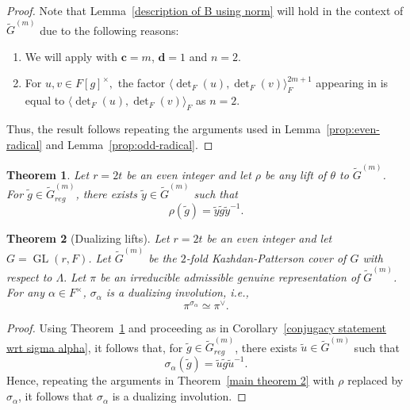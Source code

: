 \documentclass[11pt, a4paper, reqno]{amsart}
\newtheorem{theorem}{Theorem}[section]
\theoremstyle{definition}
\theoremstyle{remark}
\theoremstyle{example}
\theoremstyle{note}
\numberwithin{equation}{section}
\DeclareMathOperator{\GL}{GL}
\begin{document}
\begin{proof}
Note that Lemma~\ref{description of B using norm} will hold in the context of $\widetilde{G}^{(m)}$ due to the following reasons:
   \begin{enumerate}[label=\roman*), itemsep=0.2cm]
        \item We will apply \cite[Proposition~4.2(5a), formula~(4.10)]{Zou2025} with $\boldsymbol c=m$, $\boldsymbol d=1$ and $n=2$. 

        \item For $u, v \in F[g]^\times,$ the factor $\langle \det_F(u),\det_F(v) \rangle_F^{2m+1}$ appearing in \cite[Proposition~4.2(5a), formula~(4.10)]{Zou2025} is equal to $\langle \det_F(u),\det_F(v) \rangle_F$ as $n=2.$
  \end{enumerate}
Thus, the result follows repeating the arguments used in  Lemma~\ref{prop:even-radical} and  Lemma~\ref{prop:odd-radical}.
\end{proof}



\begin{theorem}\label{thm:even-conjugacy for twisted covers} Let $r =2t$ be an even integer and let $\rho$ be any lift of $\theta$ to  $\widetilde{G}^{(m)}$. For $\tilde{g}\in \widetilde{G}^{(m)}_{reg}$, there exists $\tilde{y}\in \widetilde{G}^{(m)}$ such that 
\[\rho(\tilde{g})=\tilde{y}\tilde{g}\tilde{y}^{-1}.
\]
\end{theorem}

\begin{theorem}[Dualizing lifts] 
Let $r =2t$ be an even integer and let $G=\GL(r,F)$. Let $\widetilde{G}^{(m)}$ be the $2$-fold Kazhdan-Patterson cover of $G$ with respect to $\Lambda.$
Let $\pi$ be an irreducible admissible genuine representation of $\widetilde{G}^{(m)}$. For any $\alpha \in F^{\times}$, $\sigma_\alpha$ is a dualizing involution, i.e.,
\[\pi^{\sigma_{\alpha}}\simeq \pi^{\vee}. \] 
\end{theorem}

\begin{proof}
 Using Theorem~\ref{thm:even-conjugacy for twisted covers} and proceeding as in Corollary~\ref{conjugacy statement wrt sigma alpha}, it follows that, for
 $\tilde{g} \in \widetilde{G}^{(m)}_{reg}$, there exists $\tilde{u}\in \widetilde{G}^{(m)}$ such that 
\[\sigma_\alpha(\tilde{g})=\tilde{u}\tilde{g}\tilde{u}^{-1}.
\]
Hence, repeating the arguments in Theorem~\ref{main theorem 2} with $\rho$ replaced by $\sigma_\alpha$, it follows that $\sigma_\alpha$ is a dualizing involution. \qedhere
\end{proof}
 
\end{document}
